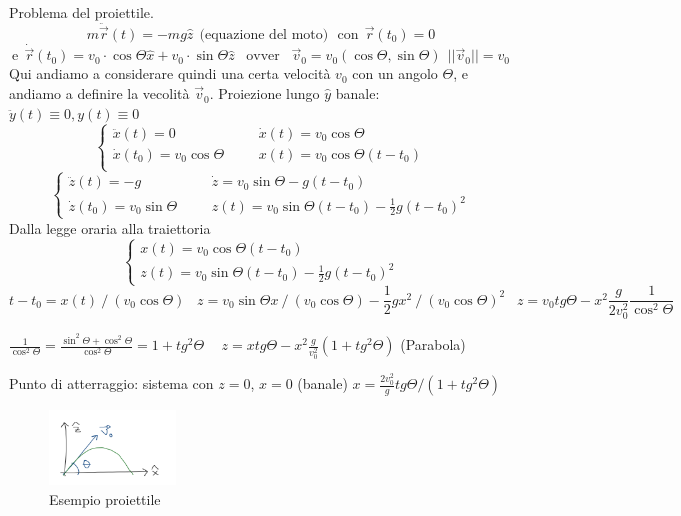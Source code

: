 \begin{example}
    Problema del proiettile.
    $$m\ddot{\vec{r}}(t) = -mg\hat{z} \:\:\text{(equazione del moto)}\:\:\: \text{con} \:\:\vec{r}(t_0) = 0$$
    $$\text{e}\:\: \dot{\vec{r}}(t_0) = v_0 \cdot \cos\Theta\hat{x} + v_0 \cdot \sin\Theta\hat{z} \hspace{10pt}\text{ovver}\hspace{10pt}\vec{v}_0 = v_0(\cos\Theta, \sin\Theta) \:\: ||\vec{v}_0|| = v_0$$
    Qui andiamo a considerare quindi una certa velocità $v_0$ con un angolo $\Theta$, e andiamo a definire la vecolità $\vec{v}_0$.
    Proiezione lungo $\hat{y}$ banale: $\ddot{y}(t) \equiv 0, y(t) \equiv 0$
    $$
    \begin{cases}
        \ddot{x}(t) = 0& \hspace{20pt} \dot{x}(t) = v_0 \cos\Theta \\
        \dot{x}(t_0) = v_0 \cos\Theta & \hspace{20pt} x(t) = v_0\cos\Theta (t-t_0)\\
    \end{cases}
    $$
    $$
    \begin{cases}
        \ddot{z}(t) = -g & \hspace{20pt} \dot{z} = v_0 \sin\Theta - g(t - t_0)\\
        \dot{z}(t_0) = v_0 \sin\Theta & \hspace{20pt} z(t) = v_0\sin\Theta(t - t_0) - \frac{1}{2}g (t - t_0)^2
    \end{cases}
    $$
    Dalla legge oraria alla traiettoria
    $$
    \begin{cases}
        x(t) = v_0 \cos\Theta(t - t_0)\\
        z(t) = v_0\sin\Theta(t - t_0) - \frac{1}{2}g(t - t_0)^2
    \end{cases}
    $$
    $$t - t_0 = x(t) \: / \: (v_0\cos\Theta) \hspace{10pt} z = v_0\sin\Theta x\: / \: (v_0 \cos\Theta) - \frac{1}{2}g x^2 \: / \: (v_0\cos\Theta)^2 \hspace{10pt} z=v_0 tg\Theta - x^2 \frac{g}{2v_0^2}\frac{1}{\cos^2\Theta}$$
    \begin{observation}
        $\frac{1}{\cos^2\Theta} = \frac{\sin^2\Theta + \cos^2\Theta}{\cos^2\Theta} = 1 + tg^2\Theta \hspace{15pt} z = x tg\Theta - x^2 \frac{g}{v_0^2}(1 + tg^2 \Theta)$ (Parabola)
    \end{observation}
    \hspace{-15pt}Punto di atterraggio: sistema con $z = 0$, $x = 0$ (banale) \hspace{10pt} $x = \frac{2v^2_0}{g}tg\Theta / (1 + tg^2 \Theta)$
\end{example}
\begin{figure}[h!]
    \centering
    \includegraphics[width=0.3\textwidth]{images/esempio-proiettile.png}
    \caption*{Esempio proiettile}
\end{figure}

